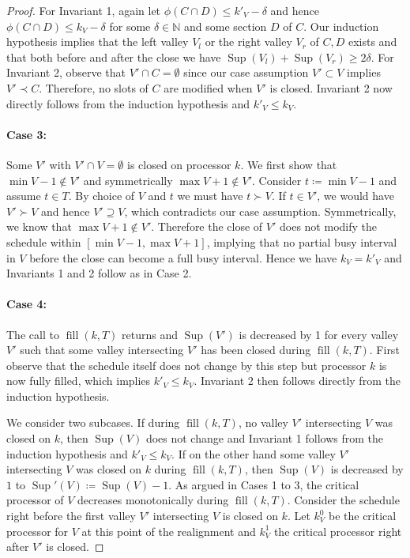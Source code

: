 \documentclass[a4paper]{article}
\DeclareMathOperator{\fillop}{fill}
\DeclareMathOperator{\res}{Sup}
\begin{document}
\begin{proof}
      For Invariant 1, again let $\phi(C \cap D) \leq k'_V - \delta$ and hence $\phi(C \cap D) \leq k_V - \delta$ for some $\delta \in \mathbb{N}$ and some section $D$ of $C$.
      Our induction hypothesis implies that the left valley $V_l$ or the right valley $V_r$ of $C, D$ exists and that both before and after the close we have $\res(V_l) + \res(V_r) \geq 2 \delta$.
      For Invariant 2, observe that $V' \cap C = \emptyset$ since our case assumption $V' \subset V$ implies $V' \prec C$.
      Therefore, no slots of $C$ are modified when $V'$ is closed.
      Invariant 2 now directly follows from the induction hypothesis and $k'_V \leq k_V$.


  \paragraph{Case 3:}
      Some $V'$ with $V' \cap V = \emptyset$ is closed on processor $k$.
      We first show that $\min V - 1 \notin V'$ and symmetrically $\max V + 1 \notin V'$.
      Consider $t \coloneqq \min V - 1$ and assume $t \in T$.
      By choice of $V$ and $t$ we must have $t \succ V$.
      If $t \in V'$, we would have $V' \succ V$ and hence $V' \supseteq V$, which contradicts our case assumption.
      Symmetrically, we know that $\max V + 1 \notin V'$.
      Therefore the close of $V'$ does not modify the schedule within $[\min V - 1, \max V + 1]$, implying that no partial busy interval in $V$ before the close can become a full busy interval.
      Hence we have $k_V = k'_V$ and Invariants 1 and 2 follow as in Case 2.

  \paragraph{Case 4:}
      The call to $\fillop(k, T)$ returns and $\res(V')$ is decreased by 1 for every valley $V'$ such that some valley intersecting $V'$ has been closed during $\fillop(k, T)$.
      First observe that the schedule itself does not change by this step but processor $k$ is now fully filled, which implies $k'_V \leq k_V$.
      Invariant 2 then follows directly from the induction hypothesis.

      We consider two subcases.
      If during $\fillop(k, T)$, no valley $V'$ intersecting $V$ was closed on $k$, then $\res(V)$ does not change and Invariant 1 follows from the induction hypothesis and $k'_V \leq k_V$.
      If on the other hand some valley $V'$ intersecting $V$ was closed on $k$ during $\fillop(k, T)$, then $\res(V)$ is decreased by $1$ to $\res'(V) \coloneqq \res(V) - 1$.
      As argued in Cases 1 to 3, the critical processor of $V$ decreases monotonically during $\fillop(k, T)$.
      Consider the schedule right before the first valley $V'$ intersecting $V$ is closed on $k$.
      Let $k^0_V$ be the critical processor for $V$ at this point of the realignment and $k^1_V$ the critical processor right after $V'$ is closed.


\end{proof}
\end{document}
